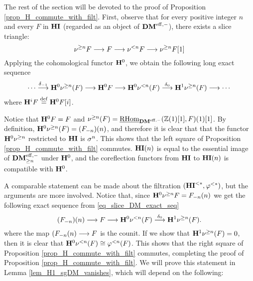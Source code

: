 The rest of the section will be devoted to the proof of
Proposition \ref{prop_H_commute_with_filt}. 
First, observe that for every positive integer $n$ and every $F$ 
in $\HI$ (regarded as an object of $\DMeff$), there exists a slice 
triangle:
\[
\sliceTriangle{n}{F}
\]
Applying the cohomological functor $\HH^0$, we obtain the
following long exact sequence
\[
\cdots \stackrel{\delta_{-1}}{\to} \HH^0 \sgDM{n}(F) \to 
   \HH^0 F \to \HH^0 \slDM{n}(F)
   \stackrel{\delta_0}{\to} \HH^1 \sgDM{n}(F) \to \cdots
\]
where $\HH^i F \defeq \HH^0F[i]$. 

Notice that $\HH^0F = F$ and $\sgDM{n}(F) = \ihomDMf(\Z(1)[1],
F)(1)[1]$. By definition, $\HH^0 \sgDM{n}(F) = \LHI[n]{(\RHI[n]{F})}$,
and therefore it is clear that that the functor $\HH^0 \sgDM{n}$
restricted to $\HI$ is $\sgHI{n}$. This shows that the left square of
Proposition \ref{prop_H_commute_with_filt} commutes. $\HI(n)$ is equal
to the essential image of $\GFiltDM[n]{\DMeff}$ under $\HH^0$, and the
coreflection functors from $\HI$ to $\HI(n)$ is compatible with
$\HH^0$.

A comparable statement can be made about the filtration 
$(\TFHI{*}, \tlHI{*})$, but the arguments are more involved.
Notice that, since $\HH^0\sgDM{n}F = \LHI[n]{\RHI[n]{F}}$ we get 
the following exact sequence from \eqref{eq_slice_DM_exact_seq}
\[
\LHI[n]{(\RHI[n]{F})} \to F \to \HH^0{\slDM{n}(F)} 
   \stackrel{\delta_0}{\to} \HH^1 \sgDM{n}(F).
\]
where the map $\LHI[n]{(\RHI[n]{F}} \to F$ is the counit. If we show
that $\HH^1 \sgDM{n}(F) = 0$, then it is clear that $\HH^0 \slDM{n}(F)
\cong \tlHI{n}(F)$. This shows that the right square of Proposition
\ref{prop_H_commute_with_filt} commutes, completing the proof of
Proposition \ref{prop_H_commute_with_filt}. We will prove this
statement in Lemma \ref{lem_H1_sgDM_vanishes}, which will depend on
the following:

